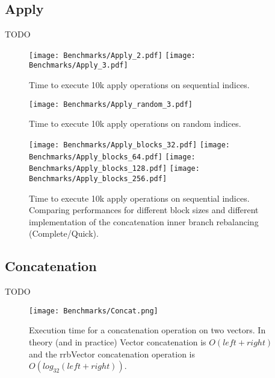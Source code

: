 \subsection{Apply}
\color{red} TODO \color{black}

\begin{figure}[h!]
  \centering
  \texttt{[image: Benchmarks/Apply\_2.pdf]}
  \texttt{[image: Benchmarks/Apply\_3.pdf]}
  \label{ApplyBenchmarks}
  \caption{Time to execute 10k apply operations on sequential indices.}
\end{figure}

\begin{figure}[h!]
  \centering
  \texttt{[image: Benchmarks/Apply\_random\_3.pdf]}
  \label{ApplyRandomBenchmarks}
  \caption{Time to execute 10k apply operations on random indices.}
\end{figure}

\begin{figure}[h!]
  \centering
  \texttt{[image: Benchmarks/Apply\_blocks\_32.pdf]}
  \texttt{[image: Benchmarks/Apply\_blocks\_64.pdf]}
  \texttt{[image: Benchmarks/Apply\_blocks\_128.pdf]}
  \texttt{[image: Benchmarks/Apply\_blocks\_256.pdf]}
  \label{ApplyBlocksBenchmarks}
  \caption{Time to execute 10k apply operations on sequential indices. Comparing performances for different block sizes and different implementation of the concatenation inner branch rebalancing (Complete/Quick).}
\end{figure}

\subsection{Concatenation}
\color{red} TODO \color{black}

\begin{figure}[h!]
  \centering
  \texttt{[image: Benchmarks/Concat.png]}
  \label{ConcatBenchmarks}
  \caption{Execution time for a concatenation operation on two vectors. In theory (and in practice) Vector concatenation is $O(left + right)$ and the rrbVector concatenation operation is $O(log_{32}(left + right))$.}
\end{figure}

